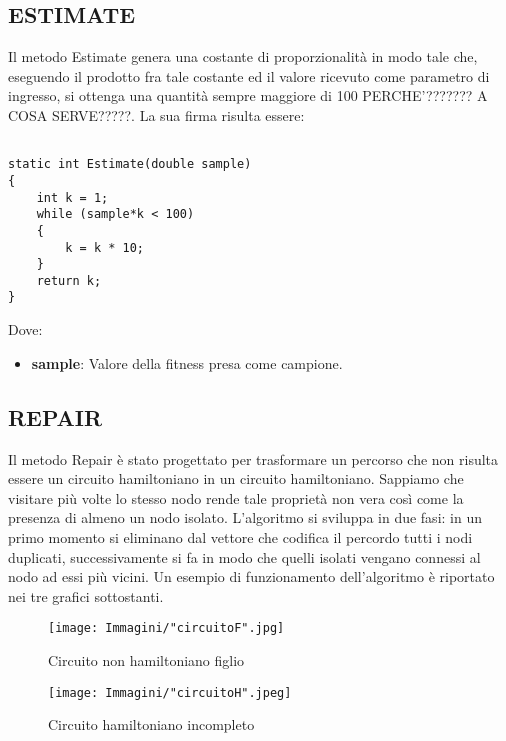 \documentclass[11pt]{article}
\begin{document}
\subsection*{ESTIMATE}
\label{sec:EstimateS}

Il metodo Estimate genera una costante di proporzionalità in modo tale che, eseguendo il prodotto fra tale costante ed il valore ricevuto come parametro di ingresso, si ottenga una quantità sempre maggiore di 100 PERCHE'??????? A COSA SERVE?????. La sua firma risulta essere:

\begin{lstlisting}

static int Estimate(double sample)
{
    int k = 1;
    while (sample*k < 100)
    {
        k = k * 10;
    }
    return k;
}

\end{lstlisting}

Dove:

\begin{itemize}
    \item \textbf{sample}: Valore della fitness presa come campione.
\end{itemize}

\subsection*{REPAIR}
\label{sec:RepairS}

Il metodo Repair è stato progettato per trasformare un percorso che non risulta essere un circuito hamiltoniano in un circuito hamiltoniano. Sappiamo che visitare più volte lo stesso nodo rende tale proprietà non vera così come la presenza di almeno un nodo isolato. L'algoritmo si sviluppa in due fasi: in un primo momento si eliminano dal vettore che codifica il percordo tutti i nodi duplicati, successivamente si fa in modo che quelli isolati vengano connessi al nodo ad essi più vicini. Un esempio di funzionamento dell'algoritmo è riportato nei tre grafici sottostanti.

\begin{figure}[htbp]
    \centering
    \texttt{[image: Immagini/"circuitoF".jpg]}
    \caption{Circuito non hamiltoniano figlio}
\end{figure}

\begin{figure}[htbp]
    \centering
    \texttt{[image: Immagini/"circuitoH".jpeg]}
    \caption{Circuito hamiltoniano incompleto}
\end{figure}
\end{document}
